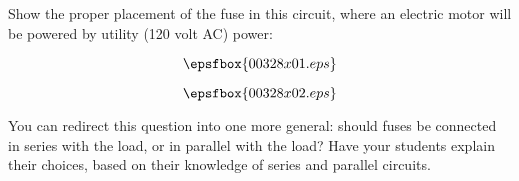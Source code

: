 

Show the proper placement of the fuse in this circuit, where an electric motor will be powered by utility (120 volt AC) power:

$$\epsfbox{00328x01.eps}$$







$$\epsfbox{00328x02.eps}$$







You can redirect this question into one more general: should fuses be connected in series with the load, or in parallel with the load?  Have your students explain their choices, based on their knowledge of series and parallel circuits.




